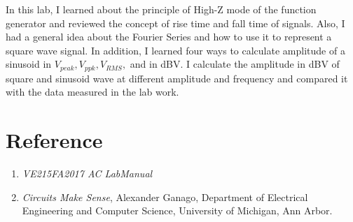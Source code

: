 \documentclass[12pt]{article}
\begin{document}
In this lab, I learned about the principle of High-Z mode of the function generator and reviewed the concept of rise time and fall time of signals. Also, I had a general idea about the Fourier Series and how to use it to represent a square wave signal. In addition, I learned four ways to calculate amplitude of a sinusoid in $V_{peak},V_{ppk},V_{RMS},$ and in dBV. I calculate the amplitude in dBV of square and sinusoid wave at different amplitude and frequency and compared it with the data measured in the lab work.
\section{Reference}
\begin{enumerate}[-]
\item \emph{VE215FA2017 AC LabManual} 
\item \emph{Circuits Make Sense}, Alexander Ganago, Department of Electrical Engineering and Computer Science, University of Michigan, Ann Arbor.
\end{enumerate}
\end{document}
